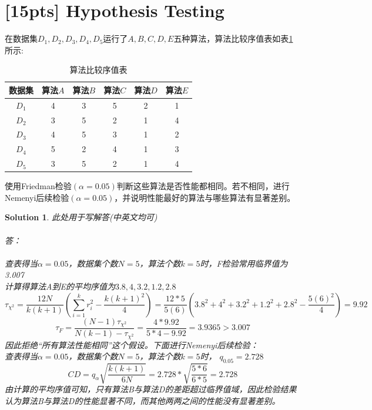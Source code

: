 \documentclass[a4paper,UTF8]{article}
\numberwithin{equation}{section}
\newtheorem*{mySol}{Solution}
\begin{document}
\section{[15pts] Hypothesis Testing} 
在数据集$D_1,D_2,D_3,D_4,D_5$运行了$A,B,C,D,E$五种算法，算法比较序值表如表\ref{table:ranking}所示:
\begin{table}[h]
\centering
\caption{算法比较序值表} \vspace{2mm}
\label{table:ranking}
\begin{tabular}{c|c c c c c}\hline
数据集 		& 算法$A$  	&算法$B$  	& 算法$C$ 	& 算法$D$  	&算法$E$ 	\\ \hline
$D_1$ 		& 4 		&  3  		& 5  		&  2 		& 1			\\
$D_2$ 		& 3 		&  5  		& 2  		&  1 		& 4			\\
$D_3$ 		& 4 		&  5  		& 3  		&  1 		& 2			\\ 
$D_4$ 		& 5 		&  2  		& 4  		&  1 		& 3			\\ 
$D_5$ 		& 3 		&  5  		& 2  		&  1 		& 4			\\ \hline
\end{tabular}
\end{table}

使用Friedman检验$(\alpha=0.05)$判断这些算法是否性能都相同。若不相同，进行Nemenyi后续检验$(\alpha=0.05)$，并说明性能最好的算法与哪些算法有显著差别。
\begin{mySol}
此处用于写解答(中英文均可)
~\\
~\\
答：\\
~\\
查表得当$\alpha = 0.05$，数据集个数$N = 5$，算法个数$k = 5$时，F检验常用临界值为3.007\\
计算得算法A到E的平均序值为$3.8,4,3.2,1.2,2.8$\\
\[
\tau_{\chi^2} 
= \frac{12N}{k(k+1)}(\sum^k_{i=1}{r_i^2}-\frac{k(k+1)^2}{4})
=\frac{12*5}{5(6)}(3.8^2+4^2+3.2^2+1.2^2+2.8^2-\frac{5(6)^2}{4})
=9.92
\]
\[
\tau_F 
= \frac{(N-1)\tau_{\chi^2}}{N(k-1)-\tau_{\chi^2}}
= \frac{4*9.92}{5*4-9.92}
= 3.9365 > 3.007 
\]
因此拒绝“所有算法性能相同”这个假设。下面进行Nemenyi后续检验：\\
查表得当$\alpha = 0.05$，数据集个数$N = 5$，算法个数$k = 5$时，
$q_{0.05}=2.728$\\
\[CD 	= q_{\alpha}\sqrt{\frac{k(k+1)}{6N}}
		= 2.728*\sqrt{\frac{5*6}{6*5}}
		= 2.728
		\]
由计算的平均序值可知，只有算法B与算法D的差距超过临界值域，因此检验结果认为算法B与算法D的性能显著不同，而其他两两之间的性能没有显著差别。
\end{mySol}
\end{document}

